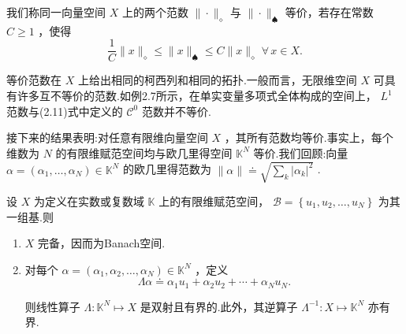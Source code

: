 我们称同一向量空间 $X$ 上的两个范数 $\|  \cdot  {\| }_{\diamond }$ 与 $\|  \cdot  {\| }_{\spadesuit}$ 等价，若存在常数 $C \geq  1$ ，使得
\begin{equation}\tag{2.16}
\frac{1}{C}\| x{\| }_{\diamond } \leq  \| x{\| }_{\spadesuit } \leq  C\| x{\| }_{\diamond }\;\forall\,x \in  X.
\end{equation}

等价范数在 $X$ 上给出相同的柯西列和相同的拓扑.一般而言，无限维空间 $X$ 可具有许多互不等价的范数.如例2.7所示，在单实变量多项式全体构成的空间上， ${L}^{1}$ 范数与(2.11)式中定义的 ${\mathcal{C}}^{0}$ 范数并不等价.

接下来的结果表明:对任意有限维向量空间 $X$ ，其所有范数均等价.事实上，每个维数为 $N$ 的有限维赋范空间均与欧几里得空间 ${\mathbb{K}}^{N}$ 等价.我们回顾:向量 $\alpha  = \left( {{\alpha }_{1},\ldots ,{\alpha }_{N}}\right)  \in  {\mathbb{K}}^{N}$ 的欧几里得范数为 $\| \alpha \|  \doteq  \sqrt{\mathop{\sum }\limits_{k}{\left| {\alpha }_{k}\right| }^{2}}$ .

\begin{theorem}
设 $X$ 为定义在实数或复数域 $\mathbb{K}$ 上的有限维赋范空间， $\mathcal{B} = \left\{  {{u}_{1},{u}_{2},\ldots ,{u}_{N}}\right\}$ 为其一组基.则
\begin{enumerate}[label=(\roman*),leftmargin=2.5em]
    \item $X$ 完备，因而为Banach空间.
    \item 对每个 $\alpha  = \left( {{\alpha }_{1},{\alpha }_{2},\ldots ,{\alpha }_{N}}\right)  \in  {\mathbb{K}}^{N}$ ，定义
\begin{equation}\tag{2.17}
{\Lambda \alpha } \doteq  {\alpha }_{1}{u}_{1} + {\alpha }_{2}{u}_{2} + \cdots  + {\alpha }_{N}{u}_{N}.
\end{equation}

则线性算子 $\Lambda  : {\mathbb{K}}^{N} \mapsto  X$ 是双射且有界的.此外，其逆算子 ${\Lambda }^{-1} : X \mapsto  {\mathbb{K}}^{N}$ 亦有界.
\end{enumerate}
\end{theorem}

